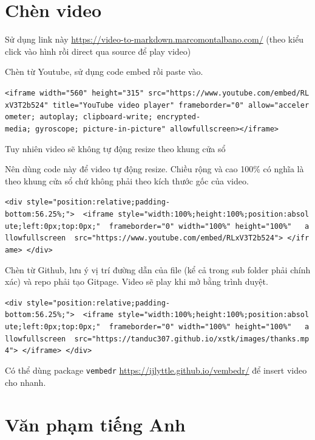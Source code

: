 \documentclass[
]{book}
\begin{document}
\hypertarget{chuxe8n-video}{%
\section{Chèn video}\label{chuxe8n-video}}

Sử dụng link này \url{https://video-to-markdown.marcomontalbano.com/} (theo kiểu click vào hình rồi direct qua source để play video)

Chèn từ Youtube, sử dụng code embed rồi paste vào.

\texttt{\textless{}iframe\ width="560"\ height="315"\ src="https://www.youtube.com/embed/RLxV3T2b524"\ title="YouTube\ video\ player"\ frameborder="0"\ allow="accelerometer;\ autoplay;\ clipboard-write;\ encrypted-media;\ gyroscope;\ picture-in-picture"\ allowfullscreen\textgreater{}\textless{}/iframe\textgreater{}}

Tuy nhiên video sẽ không tự động resize theo khung cửa sổ

Nên dùng code này để video tự động resize. Chiều rộng và cao 100\% có nghĩa là theo khung cửa sổ chứ không phải theo kích thước gốc của video.

\texttt{\textless{}div\ style="position:relative;padding-bottom:56.25\%;"\textgreater{}\ \ \textless{}iframe\ style="width:100\%;height:100\%;position:absolute;left:0px;top:0px;"\ \ frameborder="0"\ width="100\%"\ height="100\%"\ \ \ allowfullscreen\ \ src="https://www.youtube.com/embed/RLxV3T2b524"\textgreater{}\ \textless{}/iframe\textgreater{}\ \textless{}/div\textgreater{}}

Chèn từ Github, lưu ý vị trí đường dẫn của file (kể cả trong sub folder phải chính xác) và repo phải tạo Gitpage. Video sẽ play khi mở bằng trình duyệt.

\texttt{\textless{}div\ style="position:relative;padding-bottom:56.25\%;"\textgreater{}\ \ \textless{}iframe\ style="width:100\%;height:100\%;position:absolute;left:0px;top:0px;"\ \ frameborder="0"\ width="100\%"\ height="100\%"\ \ \ allowfullscreen\ \ src="https://tanduc307.github.io/xstk/images/thanks.mp4"\textgreater{}\ \textless{}/iframe\textgreater{}\ \textless{}/div\textgreater{}}

Có thể dùng package \texttt{vembedr} \url{https://ijlyttle.github.io/vembedr/} để insert video cho nhanh.

\hypertarget{vux103n-phux1ea1m-tiux1ebfng-anh}{%
\section{Văn phạm tiếng Anh}\label{vux103n-phux1ea1m-tiux1ebfng-anh}}
\end{document}
